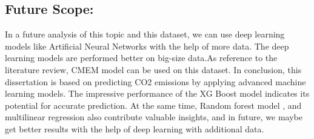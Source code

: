 \documentclass[12pt, a4paper,oneside]{book}
\numberwithin{equation}{section}
\begin{document}
\newpage
\subsection{Future Scope:}

In a future analysis of this topic and this dataset, we can use deep learning models like Artificial Neural Networks with the help of more data. The deep learning models are performed better on big-size data.As reference to the literature review, CMEM model can be used on this dataset.
In conclusion, this dissertation is based on predicting CO2 emissions by applying advanced machine learning models. The impressive performance of the XG Boost model indicates its potential for accurate prediction. At the same time, Random forest model , and multilinear regression also contribute valuable insights, and in future, we maybe get better results with the help of deep learning with additional data.









\appendix
\end{document}
